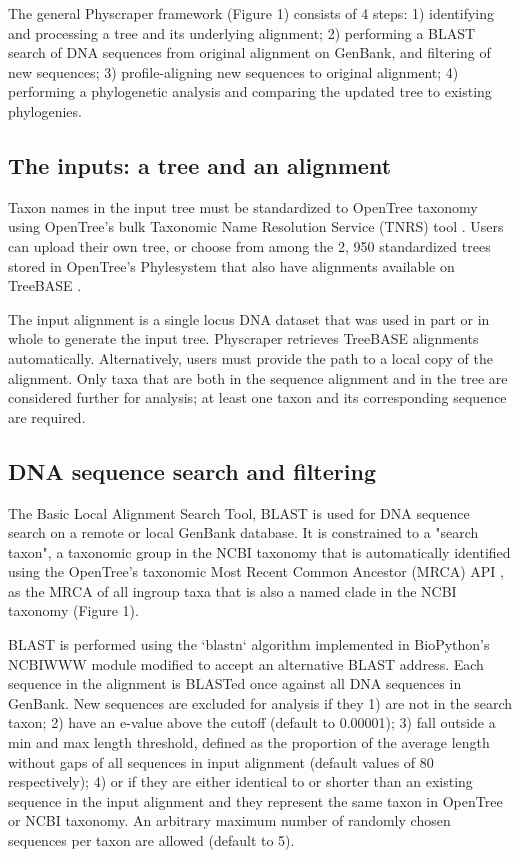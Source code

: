 \documentclass{bmcart}
\begin{document}
The general Physcraper framework (Figure 1) consists of 4 steps: 1) identifying and
processing a tree and its underlying alignment; 2) performing a BLAST search of
DNA sequences from original alignment on GenBank, and filtering of new sequences;
3) profile-aligning new sequences to original alignment; 4) performing a phylogenetic
analysis and comparing the updated tree to existing phylogenies.


\subsection*{The inputs: a tree and an alignment}

Taxon names in the input tree must be standardized to OpenTree taxonomy
\cite{rees2017automated} using OpenTree's bulk Taxonomic Name Resolution Service
(TNRS) tool \cite{TNRStool}. Users can upload their
own tree, or choose from among the 2, 950 standardized trees stored in OpenTree's
Phylesystem \cite{phylesystemGithub, mctavish2015phylesystem} that also have
alignments available on TreeBASE \cite{piel2009treebase}.

The input alignment is a single locus DNA dataset that was used in part or in
whole to generate the input tree. Physcraper retrieves TreeBASE alignments
automatically. Alternatively, users must provide the path to a local copy of the
alignment.
Only taxa that are both in the sequence alignment and in the tree are considered
further for analysis; at least one taxon and its corresponding sequence are required.

\subsection*{DNA sequence search and filtering}

The Basic Local Alignment Search Tool, BLAST \cite{altschul1990basic} is used for DNA
sequence search on a remote or local GenBank database. It is constrained to a
"search taxon", a taxonomic group in the NCBI taxonomy that is automatically
identified using the OpenTree's taxonomic Most Recent Common Ancestor (MRCA) API
\cite{mrcaAPI, rees2017automated}, as the MRCA of all ingroup taxa that is
also a named clade in the NCBI taxonomy (Figure 1).

BLAST is performed using the `blastn` algorithm \cite{camacho2009blast}
implemented in BioPython's \cite{cock2009biopython} NCBIWWW module \cite{ncbiwww}
modified to accept an alternative BLAST address.
Each sequence in the alignment is BLASTed once against all DNA sequences in GenBank.
New sequences are excluded for analysis if they 1) are not in the search taxon;
2) have an e-value above the cutoff (default to 0.00001); 3) fall outside a min
and max length threshold, defined as the proportion of the average length without
gaps of all sequences in input alignment (default values of 80%
respectively); 4) or if they are either identical to or shorter than an existing
sequence in the input alignment and they represent the same taxon in OpenTree or
NCBI taxonomy.
An arbitrary maximum number of randomly chosen sequences per taxon are allowed
(default to 5).
\end{document}
